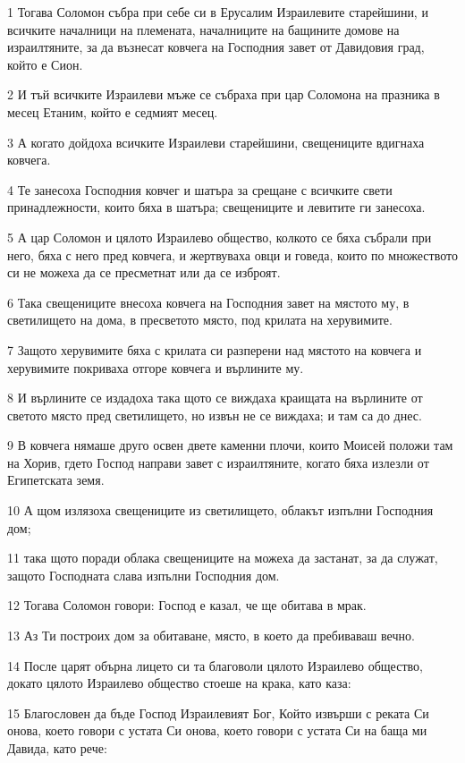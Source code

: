\par 1 Тогава Соломон събра при себе си в Ерусалим Израилевите старейшини, и всичките началници на племената, началниците на бащините домове на израилтяните, за да възнесат ковчега на Господния завет от Давидовия град, който е Сион.
\par 2 И тъй всичките Израилеви мъже се събраха при цар Соломона на празника в месец Етаним, който е седмият месец.
\par 3 А когато дойдоха всичките Израилеви старейшини, свещениците вдигнаха ковчега.
\par 4 Те занесоха Господния ковчег и шатъра за срещане с всичките свети принадлежности, които бяха в шатъра; свещениците и левитите ги занесоха.
\par 5 А цар Соломон и цялото Израилево общество, колкото се бяха събрали при него, бяха с него пред ковчега, и жертвуваха овци и говеда, които по множеството си не можеха да се пресметнат или да се изброят.
\par 6 Така свещениците внесоха ковчега на Господния завет на мястото му, в светилището на дома, в пресветото място, под крилата на херувимите.
\par 7 Защото херувимите бяха с крилата си разперени над мястото на ковчега и херувимите покриваха отгоре ковчега и върлините му.
\par 8 И върлините се издадоха така щото се виждаха краищата на върлините от светото място пред светилището, но извън не се виждаха; и там са до днес.
\par 9 В ковчега нямаше друго освен двете каменни плочи, които Моисей положи там на Хорив, гдето Господ направи завет с израилтяните, когато бяха излезли от Египетската земя.
\par 10 А щом излязоха свещениците из светилището, облакът изпълни Господния дом;
\par 11 така щото поради облака свещениците на можеха да застанат, за да служат, защото Господната слава изпълни Господния дом.
\par 12 Тогава Соломон говори: Господ е казал, че ще обитава в мрак.
\par 13 Аз Ти построих дом за обитаване, място, в което да пребиваваш вечно.
\par 14 После царят обърна лицето си та благоволи цялото Израилево общество, докато цялото Израилево общество стоеше на крака, като каза:
\par 15 Благословен да бъде Господ Израилевият Бог, Който извърши с реката Си онова, което говори с устата Си онова, което говори с устата Си на баща ми Давида, като рече:

